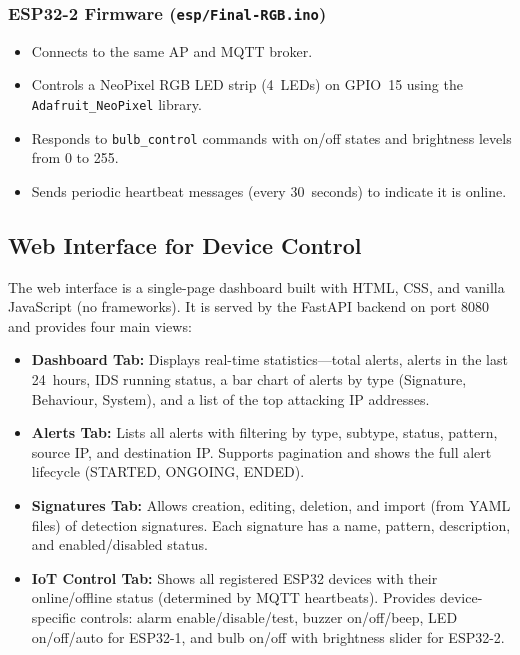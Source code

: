 \documentclass[12pt,a4paper]{article}
\begin{document}
\subsubsection*{ESP32-2 Firmware (\texttt{esp/Final-RGB.ino})}
\begin{itemize}
    \item Connects to the same AP and MQTT broker.
    \item Controls a NeoPixel RGB LED strip (4~LEDs) on GPIO~15 using the \texttt{Adafruit\_NeoPixel} library.
    \item Responds to \texttt{bulb\_control} commands with on/off states and brightness levels from 0 to 255.
    \item Sends periodic heartbeat messages (every 30~seconds) to indicate it is online.
\end{itemize}

\subsection{Web Interface for Device Control}
\label{sec:webinterface}

The web interface is a single-page dashboard built with HTML, CSS, and vanilla JavaScript (no frameworks). It is served by the FastAPI backend on port 8080 and provides four main views:

\begin{itemize}
    \item \textbf{Dashboard Tab:} Displays real-time statistics---total alerts, alerts in the last 24~hours, IDS running status, a bar chart of alerts by type (Signature, Behaviour, System), and a list of the top attacking IP addresses.
    \item \textbf{Alerts Tab:} Lists all alerts with filtering by type, subtype, status, pattern, source IP, and destination IP. Supports pagination and shows the full alert lifecycle (STARTED, ONGOING, ENDED).
    \item \textbf{Signatures Tab:} Allows creation, editing, deletion, and import (from YAML files) of detection signatures. Each signature has a name, pattern, description, and enabled/disabled status.
    \item \textbf{IoT Control Tab:} Shows all registered ESP32 devices with their online/offline status (determined by MQTT heartbeats). Provides device-specific controls: alarm enable/disable/test, buzzer on/off/beep, LED on/off/auto for ESP32-1, and bulb on/off with brightness slider for ESP32-2.
\end{itemize}
\end{document}
